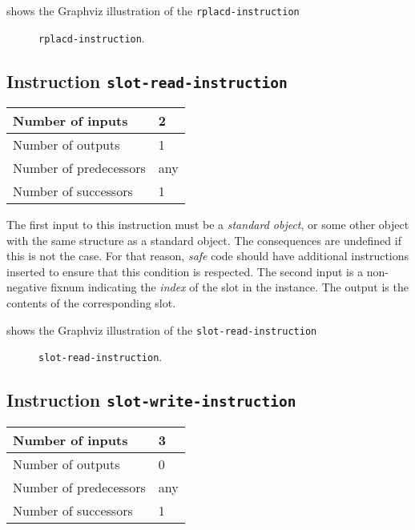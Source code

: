  shows the Graphviz illustration of the
\texttt{rplacd-instruction}

\begin{figure}
\begin{center}
\end{center}
\caption{\label{fig-rplacd-instruction}
\texttt{rplacd-instruction}.}
\end{figure}

\subsection{Instruction \texttt{slot-read-instruction}}
\label{mir-instruction-slot-read}

\begin{tabular}{|l|l|}
\hline
Number of inputs & 2\\
\hline
Number of outputs & 1\\
\hline
Number of predecessors & any\\
\hline
Number of successors & 1\\
\hline
\end{tabular}

The first input to this instruction must be a \emph{standard object},
or some other object with the same structure as a standard object.
The consequences are undefined if this is not the case.  For that
reason, \emph{safe} code should have additional instructions inserted
to ensure that this condition is respected.  The second input is a
non-negative fixnum indicating the \emph{index} of the slot in the
instance.  The output is the contents of the corresponding slot.

 shows the Graphviz illustration of the
\texttt{slot-read-instruction}

\begin{figure}
\begin{center}
\end{center}
\caption{\label{fig-slot-read-instruction}
\texttt{slot-read-instruction}.}
\end{figure}

\subsection{Instruction \texttt{slot-write-instruction}}
\label{mir-instruction-slot-write}

\begin{tabular}{|l|l|}
\hline
Number of inputs & 3\\
\hline
Number of outputs & 0\\
\hline
Number of predecessors & any\\
\hline
Number of successors & 1\\
\hline
\end{tabular}

